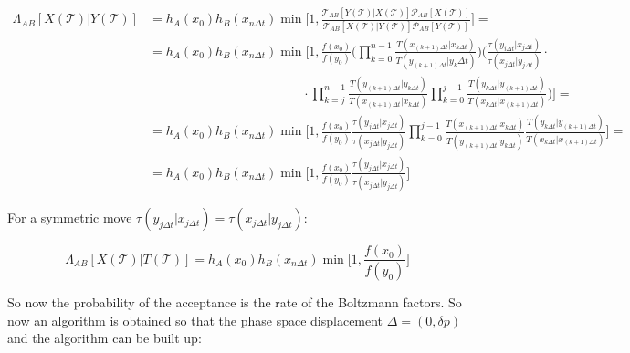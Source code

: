 	\begin{align*}
		\Lambda_{AB}[X(\mathcal{T})|Y(\mathcal{T})] &= h_A(x_0)h_B(x_{n\Delta t})\min\biggl[1, \frac{\mathcal{T}_{AB}[Y(\mathcal{T})|X(\mathcal{T})]\mathcal{P}_{AB}[X(\mathcal{T})]}{\mathcal{T}_{AB}[X(\mathcal{T})|Y(\mathcal{T})]\mathcal{P}_{AB}[Y(\mathcal{T})]}\biggr] = \\
																								&= h_A(x_0)h_B(x_{n\Delta t})\min\biggl[1, \frac{f(x_0)}{f(y_0)}\biggl(\prod\limits_{k=0}^{n-1}\frac{T(x_{(k+1)\Delta t}|x_{k\Delta t})}{T(y_{(k+1)\Delta t}|y_k\Delta t)}\biggr)\biggl(\frac{\tau(y_{i\Delta t}|x_{j\Delta t})}{\tau(x_{j\Delta t}|y_{j\Delta t})}\cdot\\
																								&\qquad\qquad\qquad\qquad\qquad\qquad\cdot\prod\limits_{k=j}^{n-1}\frac{T(y_{(k+1)\Delta t}|y_{k\Delta t})}{T(x_{(k+1)\Delta t}|x_{k\Delta t})}\prod\limits_{k=0}^{j-1}\frac{T(y_{k\Delta t}|y_{(k+1)\Delta t})}{T(x_{k\Delta t}|x_{(k+1)\Delta t})}\biggr)\biggr] = \\
																								&=h_A(x_0)h_B(x_{n\Delta t})\min\biggl[1, \frac{f(x_0)}{f(y_0)}\frac{\tau(y_{j\Delta t}|x_{j\Delta t})}{\tau(x_{j\Delta t}|y_{j\Delta t})}\prod\limits_{k=0}^{j-1}\frac{T(x_{(k+1)\Delta t}|x_{k\Delta t})}{T(y_{(k+1)\Delta t}|y_{k\Delta t})}\frac{T(y_{k\Delta t}|y_{(k+1)\Delta t})}{T(x_{k\Delta t}|x_{(k+1)\Delta t})}\biggr]=\\
																								& = h_A(x_0)h_B(x_{n\Delta t})\min\biggl[1, \frac{f(x_0)}{f(y_0)}\frac{\tau(y_{j\Delta t}|x_{j\Delta t})}{\tau(x_{j\Delta t}|y_{j\Delta t})}\biggr]
	\end{align*}

	For a symmetric move $\tau(y_{j\Delta t}|x_{j\Delta t}) = \tau(x_{j\Delta t}|y_{j\Delta t})$:

	$$\Lambda_{AB}[X(\mathcal{T})|T(\mathcal{T})] = h_A(x_0)h_B(x_{n\Delta t})\min\biggl[1, \frac{f(x_0)}{f(y_0)}\biggr]$$

	So now the probability of the acceptance is the rate of the Boltzmann factors.
	So now an algorithm is obtained so that the phase space displacement $\Delta = (0, \delta p)$ and the algorithm can be built up:

